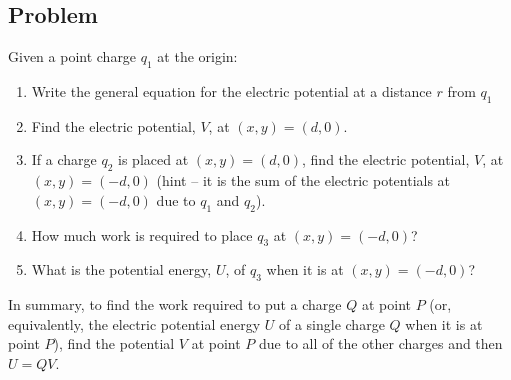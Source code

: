 \documentclass{article}
\begin{document}
\newpage

\subsection{Problem}

Given a point charge $q_1$ at the origin:

\begin{enumerate}

  \item Write the general equation for the electric potential at a distance $r$ from $q_1$

        \ifsolutions
          
        \else
          \vskip 36pt
        \fi

  \item Find the electric potential, $V$, at $(x,y) = (d,0)$.

        \ifsolutions
          
        \else
          \vskip 36pt
        \fi

  \item If a charge $q_2$ is placed at $(x,y) = (d,0)$, find the electric potential, $V$, at $(x,y) = (-d,0)$ (hint -- it is the sum of the electric potentials at $(x,y)=(-d, 0)$ due to $q_1$ and $q_2$).

        \ifsolutions
          
        \else
          \vskip 36pt
        \fi

  \item How much work is required to place $q_3$ at $(x,y) = (-d,0)$?

        \ifsolutions
          
        \else
          \vskip 36pt
        \fi

  \item What is the potential energy, $U$, of $q_3$ when it is at $(x,y) = (-d,0)$?

        \ifsolutions
          
        \else
          \vskip 36pt
        \fi

\end{enumerate}

In summary, to find the work required to put a charge $Q$ at point $P$ (or, equivalently, the electric potential energy $U$ of a single charge $Q$ when it is at point $P$), find the potential $V$ at point $P$ due to all of the other charges and then $U = QV$.

\newpage
\end{document}
